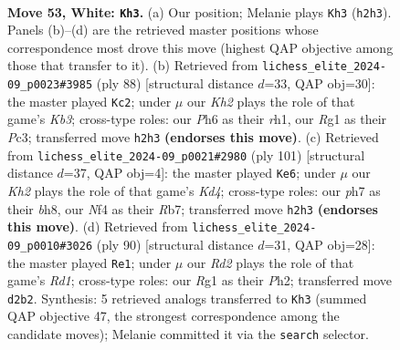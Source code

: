 \documentclass[11pt]{article}
\begin{document}
\clearpage

\begin{figure}[p]\centering
\begin{subfigure}{0.46\textwidth}\centering
\resizebox{\linewidth}{!}{%
\newchessgame
\chessboard[
  setfen={1nkb4/1p5p/6pP/p4p2/5N2/r5P1/3R3K/6R1 w - - 2 53},
  showmover=false,
  pgfstyle=straightmove, color=movearrow, markmove={h2-h3}
]}
\caption{}
\end{subfigure}\hfill
\begin{subfigure}{0.46\textwidth}\centering
\resizebox{\linewidth}{!}{%
\newchessgame
\chessboard[
  setfen={8/5p2/1P2p1k1/2R3p1/3N1bP1/1KP4p/8/7r w - - 1 45},
  showmover=false,
  pgfstyle=straightmove, color=movearrow, markmove={b3-c2}
]}
\caption{}
\end{subfigure}
\\[4pt]
\begin{subfigure}{0.46\textwidth}\centering
\resizebox{\linewidth}{!}{%
\newchessgame
\chessboard[
  setfen={3R3B/1r5p/6p1/2pk4/2n2p1P/5P1K/1P4P1/8 b - - 20 51},
  showmover=false,
  pgfstyle=straightmove, color=movearrow, markmove={d5-e6}
]}
\caption{}
\end{subfigure}\hfill
\begin{subfigure}{0.46\textwidth}\centering
\resizebox{\linewidth}{!}{%
\newchessgame
\chessboard[
  setfen={8/7k/6p1/p3pp2/2Nb4/5P2/r5PP/3R3K w - - 2 46},
  showmover=false,
  pgfstyle=straightmove, color=movearrow, markmove={d1-e1}
]}
\caption{}
\end{subfigure}
\caption{\textbf{Move 53, White: \texttt{Kh3}.} (a) Our position; Melanie plays \texttt{Kh3} (\texttt{h2h3}). Panels (b)--(d) are the retrieved master positions whose correspondence most drove this move (highest QAP objective among those that transfer to it). (b) Retrieved from \texttt{lichess\_elite\_2024-09\_p0023\#3985} (ply 88) [structural distance $d$=33, QAP obj=30]: the master played \texttt{Kc2}; under $\mu$ our \emph{Kh2} plays the role of that game's \emph{Kb3}; cross-type roles: our \emph{P}h6 as their \emph{r}h1, our \emph{R}g1 as their \emph{P}c3; transferred move \texttt{h2h3} \textbf{(endorses this move)}. (c) Retrieved from \texttt{lichess\_elite\_2024-09\_p0021\#2980} (ply 101) [structural distance $d$=37, QAP obj=4]: the master played \texttt{Ke6}; under $\mu$ our \emph{Kh2} plays the role of that game's \emph{Kd4}; cross-type roles: our \emph{p}h7 as their \emph{b}h8, our \emph{N}f4 as their \emph{R}b7; transferred move \texttt{h2h3} \textbf{(endorses this move)}. (d) Retrieved from \texttt{lichess\_elite\_2024-09\_p0010\#3026} (ply 90) [structural distance $d$=31, QAP obj=28]: the master played \texttt{Re1}; under $\mu$ our \emph{Rd2} plays the role of that game's \emph{Rd1}; cross-type roles: our \emph{R}g1 as their \emph{P}h2; transferred move \texttt{d2b2}. Synthesis: 5 retrieved analogs transferred to \texttt{Kh3} (summed QAP objective 47, the strongest correspondence among the candidate moves); Melanie committed it via the \texttt{search} selector.}
\label{fig:thought-m104}
\end{figure}
\end{document}
